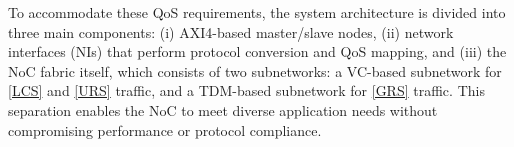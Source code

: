 To accommodate these QoS requirements, the system architecture is divided into three main components: (i) AXI4-based master/slave nodes, (ii) network interfaces (NIs) that perform protocol conversion and QoS mapping, and (iii) the NoC fabric itself, which consists of two subnetworks: a VC-based subnetwork for \ref{LCS} and \ref{URS} traffic, and a TDM-based subnetwork for \ref{GRS} traffic. 
This separation enables the NoC to meet diverse application needs without compromising performance or protocol compliance.

